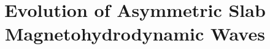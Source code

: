 \documentclass{aastex61}
\begin{document}
\title{Evolution of Asymmetric Slab Magnetohydrodynamic Waves}


\end{document}
